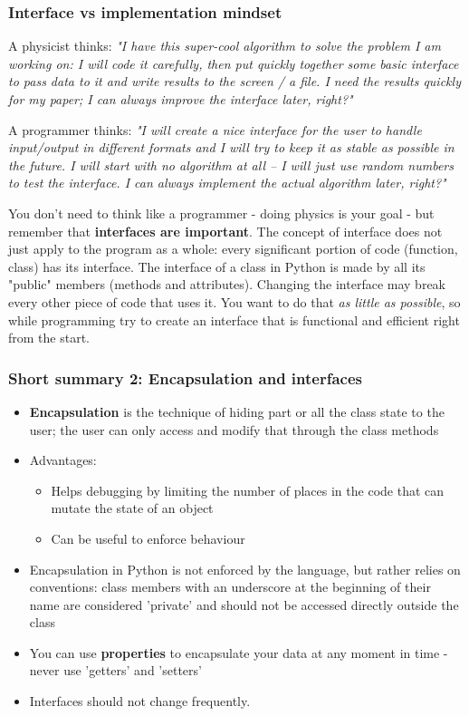 \subsubsection{Interface vs implementation mindset}

A physicist thinks:
\textit{"I have this super-cool algorithm to solve the problem I am working on: I will code it carefully, then put quickly together some basic interface to pass data to it and write results to the screen / a file. I need the results quickly for my paper; I can always improve the interface later, right?"}

A programmer thinks:
\textit{"I will create a nice interface for the user to handle input/output in different formats and I will try to keep it as stable as possible in the future. I will start with no algorithm at all -- I will just use random numbers to test the interface. I can always implement the actual algorithm later, right?"}

You don't need to think like a programmer - doing physics is your goal - but remember that \textbf{interfaces are important}. The concept of interface does not just apply to the program as a whole: every significant portion of code (function, class) has its interface. The interface of a class in Python is made by all its "public" members (methods and attributes). Changing the interface may break every other piece of code that uses it. You want to do that \textit{as little as possible}, so while programming try to create an interface that is functional and efficient right from the start.

\subsubsection{Short summary 2: Encapsulation and interfaces}
\begin{itemize}
    \item \textbf{Encapsulation} is the technique of hiding part or all the class state to the user; the user can only access and modify that through the class methods
    \item Advantages:
    \begin{itemize}
        \item Helps debugging by limiting the number of places in the code that can mutate the state of an object
        \item Can be useful to enforce behaviour
    \end{itemize}
    \item Encapsulation in Python is not enforced by the language, but rather relies on conventions: class members with an underscore at the beginning of their name are considered 'private' and should not be accessed directly outside the class
    \item You can use \textbf{properties} to encapsulate your data at any moment in time - never use 'getters' and 'setters'
    \item Interfaces should not change frequently.
\end{itemize}

